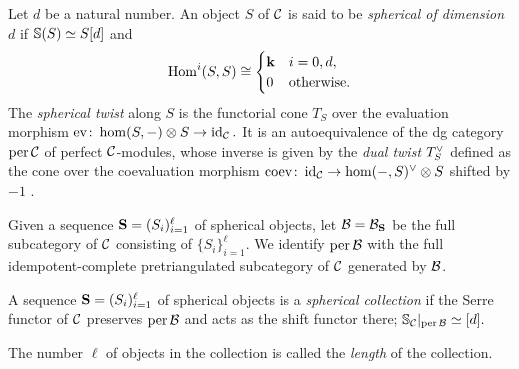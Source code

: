 \documentclass[a4paper,12pt]{amsart}
\begin{document}
Let $d$ be a natural number.
An object $S$ of $\mathcal{C}$ is said to be
\emph{spherical of dimension $d$}
if $\mathbb{S}(S) \simeq S[d]$ and
\begin{align}
 \operatorname{Hom}^i(S,S) \cong
\begin{cases}
 \mathbf{k} & i = 0, d, \\
 0 & \text{otherwise}.
\end{cases}
\end{align}
The \emph{spherical twist}
along $S$
is the functorial cone
$T_S$
over the evaluation morphism
$
\operatorname{ev} \colon \hom(S, -) \otimes S \to \operatorname{id}_{\mathcal{C}}.
$
It is
an autoequivalence
of the dg category
$\operatorname{per} \mathcal{C}$
of perfect $\mathcal{C}$-modules,
whose inverse
is given by the \emph{dual twist}
$T_S^\vee$
defined as the cone
over the coevaluation morphism
$
\operatorname{coev} \colon \operatorname{id}_{\mathcal{C}} \to \hom(-,S)^\vee \otimes S
$
shifted by $-1$
\cite{MR1831820}.

Given 
a sequence
$
\mathbf{S} = (S_i)_{i=1}^\ell
$
of spherical objects,
let
$
\mathcal{B} = \mathcal{B}_{\mathbf{S}}
$
be the full subcategory of $\mathcal{C}$
consisting of $\{ S_i \}_{i=1}^\ell$.
We identify
$\operatorname{per} \mathcal{B}$
with
the full idempotent-complete pretriangulated subcategory of $\mathcal{C}$
generated by $\mathcal{B}$.
\begin{definition}
A sequence
$
\mathbf{S} = (S_i)_{i=1}^\ell
$
of spherical objects
is 
a \emph{spherical collection}
if
the Serre functor of $\mathcal{C}$ preserves $\operatorname{per} \mathcal{B}$
and acts as the shift functor there;
$
  \mathbb{S}_{\mathcal{C}}|_{\operatorname{per} \mathcal{B}} \simeq [d].
$
\end{definition}
The number $\ell$ of objects in the collection
is called the \emph{length} of the collection.

\end{document}
